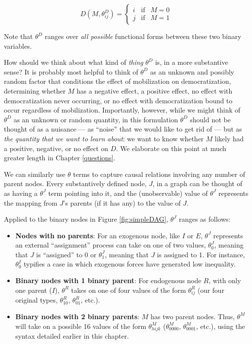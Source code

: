 \documentclass[
  12pt,
]{book}
\providecommand{\tightlist}{%
  \setlength{\itemsep}{0pt}\setlength{\parskip}{0pt}}
\begin{document}
\[D(M, \theta^D_{ij}) = \left\{\begin{array}{ccc} i & \text{if} & M=0 \\ j & \text{if} & M=1 \end{array}\right.\]

Note that \(\theta^D\) ranges over \emph{all possible} functional forms between these two binary variables.

How should we think about what kind of \emph{thing} \(\theta^D\) is, in a more substantive sense? It is probably most helpful to think of \(\theta^D\) as an unknown and possibly random factor that conditions the effect of mobilization on democratization, determining whether \(M\) has a negative effect, a positive effect, no effect with democratization never occurring, or no effect with democratization bound to occur regardless of mobilization. Importantly, however, while we might think of \(\theta^D\) as an unknown or random quantity, in this formulation \(\theta^D\) should not be thought of as a nuisance --- as ``noise'' that we would like to get rid of --- but as \emph{the quantity that we want to learn about}: we want to know whether \(M\) likely had a positive, negative, or no effect on \(D\). We elaborate on this point at much greater length in Chapter \ref{questions}.

We can similarly use \(\theta\) terms to capture causal relations involving any number of parent nodes. Every substantively defined node, \(J\), in a graph can be thought of as having a \(\theta^J\) term pointing into it, and the (unobservable) value of \(\theta^J\) represents the mapping from \(J\)'s parents (if it has any) to the value of \(J\).

Applied to the binary nodes in Figure \ref{fig:simpleDAG}, \(\theta^J\) ranges as follows:

\begin{itemize}
\tightlist
\item
  \textbf{Nodes with no parents}: For an exogenous node, like \(I\) or \(E\), \(\theta^J\) represents an external ``assignment'' process can take on one of two values, \(\theta^J_{0}\), meaning that \(J\) is ``assigned'' to \(0\) or \(\theta^J_{1}\), meaning that \(J\) is assigned to 1. For instance, \(\theta^I_{0}\) typifies a case in which exogenous forces have generated low inequality.
\item
  \textbf{Binary nodes with 1 binary parent}: For endogenous node \(R\), with only one parent (\(I\)), \(\theta^R\) takes on one of four values of the form \(\theta^R_{ij}\) (our four original types, \(\theta^R_{10}\), \(\theta^R_{01}\), etc.).
\item
  \textbf{Binary nodes with 2 binary parents}: \(M\) has two parent nodes. Thus, \(\theta^M\) will take on a possible 16 values of the form \(\theta^M_{hijk}\) (\(\theta^M_{0000}\), \(\theta^M_{0001}\), etc.), using the syntax detailed earlier in this chapter.
\end{itemize}
\end{document}
